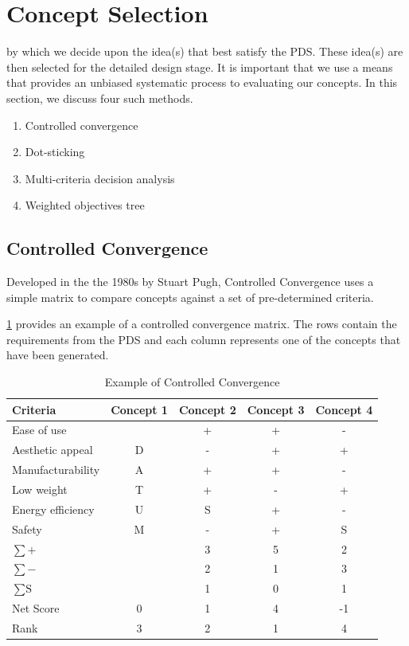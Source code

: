 \section{Concept Selection} 

 by which we decide upon the idea(s) that best satisfy the \ac{PDS}. These idea(s) are then selected for the detailed design stage. It is important that we use a means that provides an unbiased systematic process to evaluating our concepts. In this section, we discuss four such methods.

\begin{enumerate}
\item Controlled convergence
\item Dot-sticking
\item Multi-criteria decision analysis
\item Weighted objectives tree
\end{enumerate}

\subsection{Controlled Convergence} Developed in the the 1980s by Stuart Pugh\cite{pugh1993}, Controlled Convergence uses a simple matrix to compare concepts against a set of pre-determined criteria.

\cref{tbl-controlled-convergence} provides an example of a controlled convergence matrix. The rows contain the requirements from the \ac{PDS} and each column represents one of the concepts that have been generated.

\begin{table}[ht!]
  \center
  \small
  \caption{Example of Controlled Convergence}
  \begin{tabular}{l c c c c}
    \toprule
    Criteria & Concept 1 & Concept 2 & Concept 3 & Concept 4 \\
    \midrule
    Ease of use &  & + & + & - \\
    Aesthetic appeal & D & - & + & + \\
    Manufacturability & A & + & + & - \\
    Low weight & T & + & - & + \\
    Energy efficiency & U & S & + & - \\
    Safety & M & - & + & S \\
    $\sum+$ & & 3 & 5 & 2 \\
    $\sum-$ & & 2 & 1 & 3 \\
    $\sum\text{S}$ & & 1 & 0 & 1 \\
    \midrule
    Net Score & 0 & 1 & 4 & -1 \\
    Rank & 3 & 2 & 1 & 4 \\
    \bottomrule
  \end{tabular}
  \label{tbl-controlled-convergence}
\end{table}

